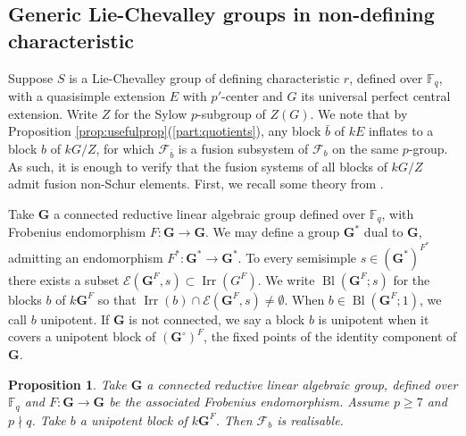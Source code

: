 \documentclass{amsart}
\theoremstyle{plain}\newtheorem{theorem}{Theorem}[section]
\theoremstyle{plain}\newtheorem{conjecture}[theorem]{Conjecture}
\theoremstyle{plain}\newtheorem{corollary}[theorem]{Corollary}
\theoremstyle{plain}\newtheorem{lemma}[theorem]{Lemma}
\theoremstyle{plain}\newtheorem{proposition}[theorem]{Proposition}
\theoremstyle{plain}\newtheorem{statement}[theorem]{}
\theoremstyle{definition}\newtheorem{definition}[theorem]{Definition}
\theoremstyle{definition}\newtheorem{example}[theorem]{Example}
\theoremstyle{definition}\newtheorem{examples}[theorem]{Examples}
\theoremstyle{definition}\newtheorem{notation}[theorem]{Notation}
\theoremstyle{definition}\newtheorem{remark}[theorem]{Remark}
\theoremstyle{definition}\newtheorem{remarks}[theorem]{Remarks}
\theoremstyle{definition}\newtheorem{question}[theorem]{Question}
\theoremstyle{definition}\newtheorem{propositiondefinition}[theorem]{Definition/Proposition}
\begin{document}
\subsection{Generic Lie-Chevalley groups in non-defining characteristic}
Suppose $S$ is a Lie-Chevalley group of defining characteristic $r$, defined over $\mathbb{F}_q$, with a quasisimple extension $E$ with $p'$-center and $G$ its universal perfect central extension.
Write $Z$ for the Sylow $p$-subgroup of $Z(G)$. We note that by Proposition \ref{prop:usefulprop}(\ref{part:quotients}), any block $\bar{b}$ of $kE$ inflates to a block $b$ of $kG/Z$, for which $\mathcal{F}_{\bar{b}}$ is a fusion subsystem of $\mathcal{F}_b$ on the same $p$-group. As such, it is enough to verify that the fusion systems of all blocks of $kG/Z$ admit fusion non-Schur elements. First, we recall some theory from \cite{Cabanes}.


Take $\mathbf{G}$ a connected reductive linear algebraic group defined over $\mathbb{F}_q$, with Frobenius endomorphism $F:\mathbf{G} \rightarrow \mathbf{G}$. We may define a group $\mathbf{G}^*$ dual to $\mathbf{G}$, admitting an endomorphism $F^*:\mathbf{G}^* \rightarrow \mathbf{G}^*$. To every semisimple $s \in (\mathbf{G}^*)^{F^*}$ there exists a subset $\mathcal{E}(\mathbf{G}^F, s) \subset \operatorname{Irr}(G^F)$. We write $\operatorname{Bl}(\mathbf{G}^F; s)$ for the blocks $b$ of $k\mathbf{G}^F$ so that $\operatorname{Irr}(b) \cap \mathcal{E}(\mathbf{G}^F, s) \not=\emptyset$. When $b \in \operatorname{Bl}(\mathbf{G}^F; 1)$, we call $b$ unipotent. If $\mathbf{G}$ is not connected, we say a block $b$ is unipotent when it covers a unipotent block of $(\mathbf{G}^\circ)^F$, the fixed points of the identity component of $\mathbf{G}$.
\begin{proposition}\cite[Theorem 7.11]{Cabanes}\label{prop:unipotent}
	Take $\mathbf{G}$ a connected reductive linear algebraic group, defined over $\mathbb{F}_q$ and $F: \mathbf{G} \rightarrow \mathbf{G}$ be the associated Frobenius endomorphism.  Assume $p \geq 7$ and $p \nmid q$. Take $b$ a unipotent block of $k\mathbf{G}^F$. Then $\mathcal{F}_b$ is realisable.
\end{proposition}
\end{document}
